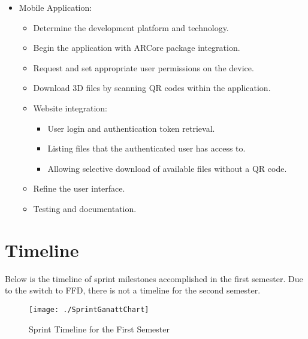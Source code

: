 \begin{itemize}
		\item Mobile Application:
		\begin{itemize}
			\item Determine the development platform and technology.
			\item Begin the application with ARCore package integration.
			\item Request and set appropriate user permissions on the device.
			\item Download 3D files by scanning QR codes within the application.
			\item Website integration:
			\begin{itemize}
				\item User login and authentication token retrieval.
				\item Listing files that the authenticated user has access to.
				\item Allowing selective download of available files without a QR code.
			\end{itemize}
			\item Refine the user interface.
			\item Testing and documentation.
		\end{itemize}
	\end{itemize}

\section{Timeline}
Below is the timeline of sprint milestones accomplished in the first semester. Due to the switch to FFD, there is not a timeline for the second semester.

\begin{figure}[h]
\begin{center}
\texttt{[image: ./SprintGanattChart]}
\end{center}
\caption{Sprint Timeline for the First Semester}
\end{figure}
